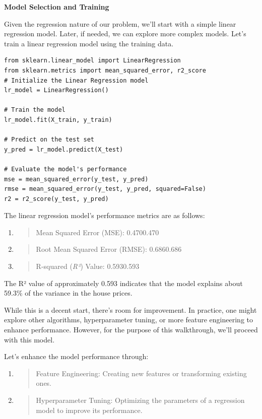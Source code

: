 \documentclass[]{article}
\begin{document}
\textbf{Model Selection and Training}

Given the regression nature of our problem, we'll start with a simple
linear regression model. Later, if needed, we can explore more complex
models. Let's train a linear regression model using the training data.

\begin{verbatim}
from sklearn.linear_model import LinearRegression
from sklearn.metrics import mean_squared_error, r2_score
# Initialize the Linear Regression model
lr_model = LinearRegression()

# Train the model
lr_model.fit(X_train, y_train)

# Predict on the test set
y_pred = lr_model.predict(X_test)

# Evaluate the model's performance
mse = mean_squared_error(y_test, y_pred)
rmse = mean_squared_error(y_test, y_pred, squared=False)
r2 = r2_score(y_test, y_pred)
\end{verbatim}

The linear regression model's performance metrics are as follows:

\begin{enumerate}
\def\labelenumi{\arabic{enumi}.}
\item
  \begin{quote}
  Mean Squared Error (MSE): 0.4700.470
  \end{quote}
\item
  \begin{quote}
  Root Mean Squared Error (RMSE): 0.6860.686
  \end{quote}
\item
  \begin{quote}
  R-squared (\emph{R²}) Value: 0.5930.593
  \end{quote}
\end{enumerate}

The R² value of approximately 0.593 indicates that the model explains
about 59.3\% of the variance in the house prices.

While this is a decent start, there's room for improvement. In practice,
one might explore other algorithms, hyperparameter tuning, or more
feature engineering to enhance performance. However, for the purpose of
this walkthrough, we'll proceed with this model.

Let's enhance the model performance through:

\begin{enumerate}
\def\labelenumi{\arabic{enumi}.}
\item
  \begin{quote}
  Feature Engineering: Creating new features or transforming existing
  ones.
  \end{quote}
\item
  \begin{quote}
  Hyperparameter Tuning: Optimizing the parameters of a regression model
  to improve its performance.
  \end{quote}
\end{enumerate}
\end{document}
